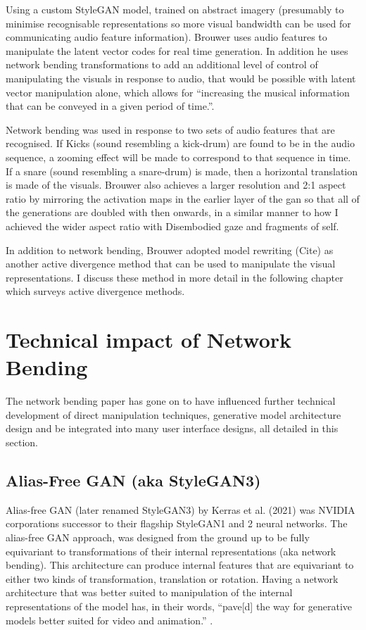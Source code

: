 Using a custom StyleGAN model, trained on abstract imagery (presumably to minimise recognisable representations so more visual bandwidth can be used for communicating audio feature information).
 Brouwer uses audio features to manipulate the latent vector codes for real time generation. 
 In addition he uses network bending transformations to add an additional level of control of manipulating the visuals in response to audio, that would be possible with latent vector manipulation alone, which allows for “increasing the musical information that can be conveyed in a given period of time.”. 

Network bending was used in response to two sets of audio features that are recognised.
If Kicks (sound resembling a kick-drum) are found to be in the audio sequence, a zooming effect will be made to correspond to that sequence in time. If a snare (sound resembling a snare-drum) is made, then a horizontal translation is made of the visuals. 
Brouwer also achieves a larger resolution and 2:1 aspect ratio by mirroring the activation maps in the earlier layer of the gan so that all of the generations are doubled with then onwards, in a similar manner to how I achieved the wider aspect ratio with Disembodied gaze and fragments of self. 

In addition to network bending, Brouwer adopted model rewriting (Cite) as another active divergence method that can be used to manipulate the visual representations. 
I discuss these method in more detail in the following chapter which surveys active divergence methods.

\section{Technical impact of Network Bending}

The network bending paper has gone on to have influenced further technical development of direct manipulation techniques, generative model architecture design and be integrated into many user interface designs, all detailed in this section.

 \subsection{Alias-Free GAN (aka StyleGAN3)}

 Alias-free GAN (later renamed StyleGAN3) by Kerras et al. (2021) was NVIDIA corporations successor to their flagship StyleGAN1 and 2 neural networks. 
 The alias-free GAN approach, was designed from the ground up to be fully equivariant to transformations of their internal representations (aka network bending). 
 This architecture can produce internal features that are equivariant to either two kinds of transformation, translation or rotation. 
 Having a network architecture that was better suited to manipulation of the internal representations of the model has, in their words, “pave[d] the way for generative models better suited for video and animation.” \citep{karras2021alias}.

